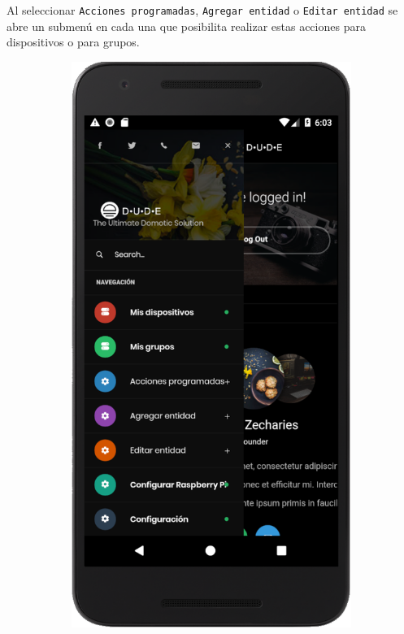 Al seleccionar \lstinline[columns=fixed]{Acciones programadas}, \lstinline[columns=fixed]{Agregar entidad} o \lstinline[columns=fixed]{Editar entidad} se abre un submenú en cada una que posibilita realizar estas acciones para dispositivos o para grupos.~

\begin{figure}[H]
  \centering

  \begin{subfigure}[b]{0.2\textwidth}
    \includegraphics[width=\textwidth, keepaspectratio]{images/app-movil-sidebar}

\end{subfigure}
\end{figure}
